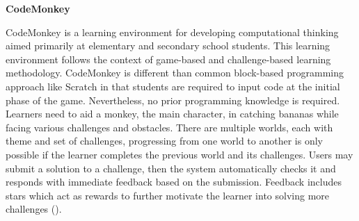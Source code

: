 \flushleft
\textbf{CodeMonkey}\\
\justifying

\parx
CodeMonkey is a learning environment for developing computational thinking aimed
primarily at elementary and secondary school students. This learning environment
follows the context of game-based and challenge-based learning methodology.
CodeMonkey is different than common block-based programming approach like Scratch
in that students are required to input code at the initial phase of the game.
Nevertheless, no prior programming knowledge is required. Learners need to aid
a monkey, the main character, in catching bananas while facing various challenges
and obstacles. There are multiple worlds, each with theme and set of challenges,
progressing from one world to another is only possible if the learner completes
the previous world and its challenges. Users may submit a solution to a challenge,
then the system automatically checks it and responds with immediate feedback based
on the submission. Feedback includes stars which act as rewards to further
motivate the learner into solving more challenges (\cite{codemonkey_2020}).
